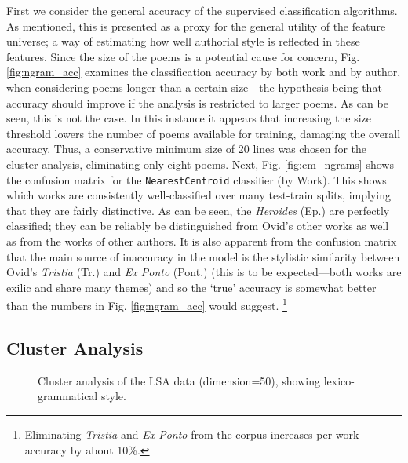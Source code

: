 \documentclass[twocolumn, switch, a4paper]{article} %
\begin{document}
First we consider the general accuracy of the supervised classification
algorithms. As mentioned, this is presented as a proxy for the general utility
of the feature universe; a way of estimating how well authorial style is
reflected in these features. Since the size of the poems is a potential cause
for concern, Fig. \ref{fig:ngram_acc} examines the classification accuracy by
both work and by author, when considering poems longer than a certain
size---the hypothesis being that accuracy should improve if the analysis is
restricted to larger poems. As can be seen, this is not the case. In this
instance it appears that increasing the size threshold lowers the number of
poems available for training, damaging the overall accuracy. Thus, a
conservative minimum size of 20 lines was chosen for the cluster analysis,
eliminating only eight poems. Next, Fig. \ref{fig:cm_ngrams} shows the
confusion matrix for the \texttt{NearestCentroid} classifier (by Work). This
shows which works are consistently well-classified over many test-train
splits, implying that they are fairly distinctive. As can be seen, the
\emph{Heroides} (Ep.) are perfectly classified; they can be reliably be
distinguished from Ovid's other works as well as from the works of other
authors. It is also apparent from the confusion matrix that the main source of
inaccuracy in the model is the stylistic similarity between Ovid's
\emph{Tristia} (Tr.) and \emph{Ex Ponto} (Pont.) (this is to be
expected---both works are exilic and share many themes) and so the `true'
accuracy is somewhat better than the numbers in Fig. \ref{fig:ngram_acc} would
suggest.%
%
    \footnote{Eliminating \emph{Tristia} and \emph{Ex Ponto} from the
    corpus increases per-work accuracy by about 10\%.}
%

\subsection{Cluster Analysis}

\begin{figure*}
  \caption{Cluster analysis of the LSA data (dimension=50), showing
  lexico-grammatical style.}
  \label{fig:ngram_cluster}
  \centering
\end{figure*}
\end{document}
